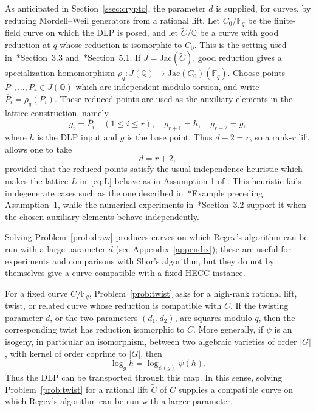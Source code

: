 \documentclass{amsart}
\newcommand{\Q}{{\mathbb Q}}
\newcommand{\F}{{\mathbb F}}
\newcommand{\Jac}{\mathrm{Jac}}
\begin{document}
As anticipated in Section~\ref{ssec:crypto}, the parameter $d$ is supplied, for
curves, by reducing Mordell--Weil generators from a rational lift. Let
$C_0/\F_q$ be the finite-field curve on which the DLP is posed, and let
$\widetilde C/\Q$ be a curve with good reduction at $q$ whose reduction is
isomorphic to $C_0$. This is the setting used
in~\cite{BarbulescuBarcauPasol2025}*{Section~3.3}
and~\cite{BarbulescuBisson2024}*{Section~5.1}. If
$J=\Jac(\widetilde C)$, good reduction gives a specialization homomorphism
$
\rho_q:J(\Q)\longrightarrow \Jac(C_0)(\F_q)
$. 
Choose points $P_1,\ldots,P_r\in J(\Q)$ which are independent modulo torsion,
and write $\overline P_i=\rho_q(P_i)$. These reduced points are used as the
auxiliary elements in the lattice construction, namely
\[
g_i=\overline P_i\quad (1\le i\le r), \quad g_{r+1}=h,\quad g_{r+2}=g,
\]
where $h$ is the DLP input and $g$ is the base point. Thus $d-2=r$, so a
rank-$r$ lift allows one to take
\[
d=r+2,
\]
provided that the reduced points satisfy the usual independence
heuristic which makes the lattice $L$ in~\eqref{eq:L} behave as in Assumption 1
of \cite{Ekera2024}. This heuristic fails in degenerate cases such as the one
described in~\cite{Ekera2024}*{Example preceding Assumption~1}, while the
numerical experiments in~\cite{BarbulescuBarcauPasol2025}*{Section~3.2} support
it when the chosen auxiliary elements behave independently.

Solving Problem~\ref{prob:draw} produces curves on which Regev's algorithm can
be run with a large parameter \(d\) (see Appendix~\ref{appendix}); these are
useful for experiments and comparisons with Shor's algorithm, but they do not by
themselves give a curve compatible with a fixed HECC instance.

For a fixed curve \(C/\F_q\), Problem~\ref{prob:twist} asks for a high-rank
rational lift, twist, or related curve whose reduction is compatible with \(C\).
If the twisting parameter \(d\), or the two parameters \((d_1,d_2)\), are squares
modulo \(q\), then the corresponding twist has reduction isomorphic to \(C\).
More generally, if \(\psi\) is an isogeny, in particular an isomorphism, between
two algebraic varieties of order \(|G|\), with kernel of order coprime to
\(|G|\), then
$$\log_gh=\log_{\psi(g)}\psi(h).$$
Thus the DLP can be transported through this map. In this sense, solving
Problem~\ref{prob:twist} for a rational lift \(\widetilde C\) of \(C\) supplies
a compatible curve on which Regev's algorithm can be run with a larger parameter.
\end{document}
